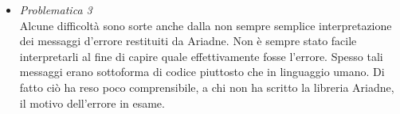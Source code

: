 \documentclass[12pt]{article}
\begin{document}
\begin{itemize}
	\item \textit{Problematica 3}\\
	Alcune difficoltà sono sorte anche dalla non sempre semplice interpretazione dei messaggi d'errore restituiti da Ariadne. Non è sempre stato facile interpretarli al fine di capire quale effettivamente fosse l'errore. Spesso tali messaggi erano sottoforma di codice piuttosto che in linguaggio umano. Di fatto ciò ha reso poco comprensibile, a chi non ha scritto la libreria Ariadne, il motivo dell'errore in esame.	
	
\end{itemize}



\newpage
\end{document}
